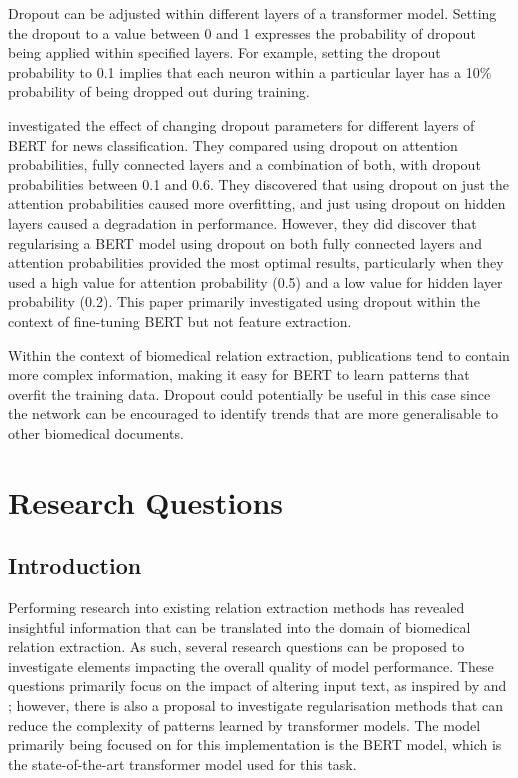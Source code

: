 \documentclass{l4proj}
\begin{document}
Dropout can be adjusted within different layers of a transformer model. Setting the dropout to a value between 0 and 1 expresses the probability of dropout being applied within specified layers. For example, setting the dropout probability to 0.1 implies that each neuron within a particular layer has a 10\% probability of being dropped out during training.

\cite{BERT-dropout} investigated the effect of changing dropout parameters for different layers of BERT for news classification. They compared using dropout on attention probabilities, fully connected layers and a combination of both, with dropout probabilities between 0.1 and 0.6. They discovered that using dropout on just the attention probabilities caused more overfitting, and just using dropout on hidden layers caused a degradation in performance. However, they did discover that regularising a BERT model using dropout on both fully connected layers and attention probabilities provided the most optimal results, particularly when they used a high value for attention probability (0.5) and a low value for hidden layer probability (0.2). This paper primarily investigated using dropout within the context of fine-tuning BERT but not feature extraction.

Within the context of biomedical relation extraction, publications tend to contain more complex information, making it easy for BERT to learn patterns that overfit the training data. Dropout could potentially be useful in this case since the network can be encouraged to identify trends that are more generalisable to other biomedical documents.

\chapter{Research Questions}

\section{Introduction}
Performing research into existing relation extraction methods has revealed insightful information that can be translated into the domain of biomedical relation extraction. As such, several research questions can be proposed to investigate elements impacting the overall quality of model performance. These questions primarily focus on the impact of altering input text, as inspired by \cite{architectures} and \cite{mask}; however, there is also a proposal to investigate regularisation methods that can reduce the complexity of patterns learned by transformer models. The model primarily being focused on for this implementation is the BERT model, which is the state-of-the-art transformer model used for this task. 
\end{document}
